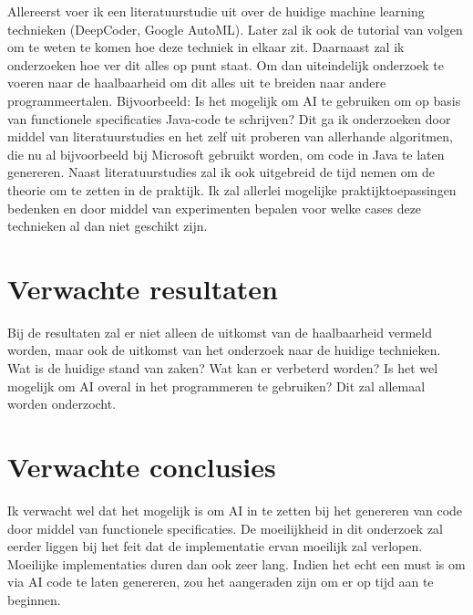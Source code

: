 \documentclass[fleqn,10pt]{voorstel}
\begin{document}
Allereerst voer ik een literatuurstudie uit over de huidige machine learning technieken (DeepCoder, Google AutoML). Later zal ik ook de tutorial van \textcite{github} volgen om te weten te komen hoe deze techniek in elkaar zit. \break \break
Daarnaast zal ik onderzoeken hoe ver dit alles op punt staat. Om dan uiteindelijk onderzoek te voeren naar de haalbaarheid om dit alles uit te breiden naar andere programmeertalen. Bijvoorbeeld: Is het mogelijk om AI te gebruiken om op basis van functionele specificaties Java-code te schrijven? Dit ga ik onderzoeken door middel van literatuurstudies en het zelf uit proberen van allerhande algoritmen, die nu al bijvoorbeeld bij Microsoft gebruikt worden, om code in Java te laten genereren. 
\break \break
Naast literatuurstudies zal ik ook uitgebreid de tijd nemen om de theorie om te zetten in de praktijk. Ik zal allerlei mogelijke praktijktoepassingen bedenken en door middel van experimenten bepalen voor welke cases deze technieken al dan niet geschikt zijn.


\section{Verwachte resultaten}
\label{sec:verwachte_resultaten}

Bij de resultaten zal er niet alleen de uitkomst van de haalbaarheid vermeld worden, maar ook de uitkomst van het onderzoek naar de huidige technieken. Wat is de huidige stand van zaken? Wat kan er verbeterd worden? Is het wel mogelijk om AI overal in het programmeren te gebruiken? Dit zal allemaal worden onderzocht.

\section{Verwachte conclusies}
\label{sec:verwachte_conclusies}

Ik verwacht wel dat het mogelijk is om AI in te zetten bij het genereren van code door middel van functionele specificaties. De moeilijkheid in dit onderzoek zal eerder liggen bij het feit dat de implementatie ervan moeilijk zal verlopen. Moeilijke implementaties duren dan ook zeer lang. Indien het echt een must is om via AI code te laten genereren, zou het aangeraden zijn om er op tijd aan te beginnen.


\printbibliography[heading=bibintoc]
\end{document}
